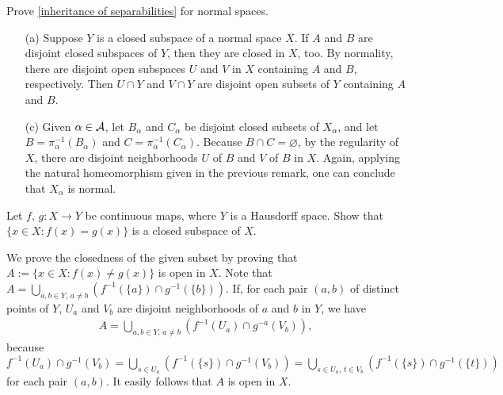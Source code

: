 \begin{prob}\label{inheritance: normal}
    Prove \cref{inheritance of separabilities} for normal spaces.
\end{prob}
\begin{sol}
    \begin{enumerate}
        \item[(a)]
        {    
            Suppose $Y$ is a closed subspace of a normal space $X$.
            If $A$ and $B$ are disjoint closed subspaces of $Y$, then they are closed in $X$, too.
            By normality, there are disjoint open subspaces $U$ and $V$ in $X$ containing $A$ and $B$, respectively.
            Then $U\cap Y$ and $V\cap Y$ are disjoint open subsets of $Y$ containing $A$ and $B$.
        }
        \item[(c)]
        {
            Given $\alpha\in{\mathcal{A}}$, let $B_\alpha$ and $C_\alpha$ be disjoint closed subsets of $X_\alpha$, and let $B=\pi_\alpha^{-1}(B_\alpha)$ and $C=\pi_\alpha^{-1}(C_\alpha)$.
            Because $B\cap C=\varnothing$, by the regularity of $X$, there are disjoint neighborhoods $U$ of $B$ and $V$ of $B$ in $X$.
            Again, applying the natural homeomorphism given in the previous remark, one can conclude that $X_\alpha$ is normal.
        }
    \end{enumerate}
\end{sol}

\begin{prob}
    Let $f,\,g: X\rightarrow Y$ be continuous maps, where $Y$ is a Hausdorff space.
    Show that $\{x\in X: f(x)=g(x)\}$ is a closed subspace of $X$.
\end{prob}
\begin{sol}
    We prove the closedness of the given subset by proving that $A:=\{x\in X: f(x)\neq g(x)\}$ is open in $X$.
    Note that $A=\bigcup_{a, b\in Y,\, a\neq b}(f^{-1}(\{a\})\cap g^{-1}(\{b\}))$.
    If, for each pair $(a, b)$ of distinct points of $Y$, $U_a$ and $V_b$ are disjoint neighborhoods of $a$ and $b$ in $Y$, we have
    \begin{align*}
        A=\bigcup_{a, b\in Y,\, a\neq b} (f^{-1}(U_a)\cap g^{-a}(V_b)),
    \end{align*}
    because $f^{-1}(U_a)\cap g^{-1}(V_b)=\bigcup_{s\in U_a}\left(f^{-1}(\{s\})\cap g^{-1}(V_b)\right)=\bigcup_{s\in U_a,\, t\in V_b}(f^{-1}(\{s\})\cap g^{-1}(\{t\}))$ for each pair $(a, b)$.
    It easily follows that $A$ is open in $X$.
\end{sol}

